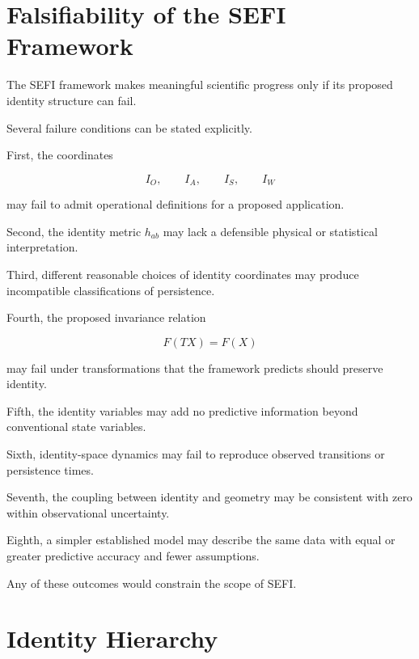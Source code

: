 \documentclass[12pt,oneside]{book}
\begin{document}
\section{Falsifiability of the SEFI Framework}
\label{sec:sefi-falsifiability}

The SEFI framework makes meaningful scientific progress only if
its proposed identity structure can fail.

Several failure conditions can be stated explicitly.

First, the coordinates

\begin{equation}
    I_O,
    \qquad
    I_A,
    \qquad
    I_S,
    \qquad
    I_W
\end{equation}

may fail to admit operational definitions for a proposed
application.

Second, the identity metric \(h_{ab}\) may lack a defensible
physical or statistical interpretation.

Third, different reasonable choices of identity coordinates may
produce incompatible classifications of persistence.

Fourth, the proposed invariance relation

\begin{equation}
    F(TX)
    =
    F(X)
\end{equation}

may fail under transformations that the framework predicts
should preserve identity.

Fifth, the identity variables may add no predictive information
beyond conventional state variables.

Sixth, identity-space dynamics may fail to reproduce observed
transitions or persistence times.

Seventh, the coupling between identity and geometry may be
consistent with zero within observational uncertainty.

Eighth, a simpler established model may describe the same data
with equal or greater predictive accuracy and fewer assumptions.

Any of these outcomes would constrain the scope of SEFI.


\section{Identity Hierarchy}
\label{sec:sefi-identity-hierarchy}
\end{document}
